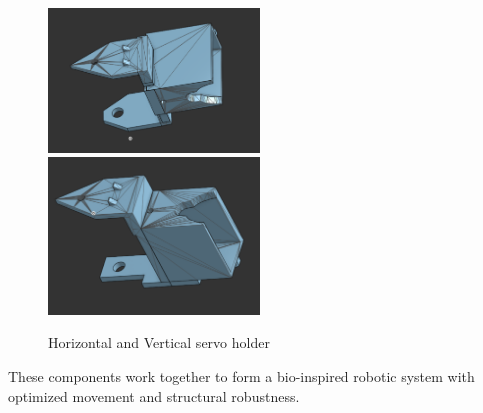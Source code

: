 \documentclass[12pt,a4paper]{report}
\begin{document}
\begin{figure}[h]
\centering
\includegraphics[width=0.5\textwidth]{media/Vertical-holder.png}
\includegraphics[width=0.5\textwidth]{media/Horizontal-holder.png}
\caption{Horizontal and Vertical servo holder}
\end{figure}

These components work together to form a bio-inspired robotic system with optimized movement and structural robustness.
\end{document}
